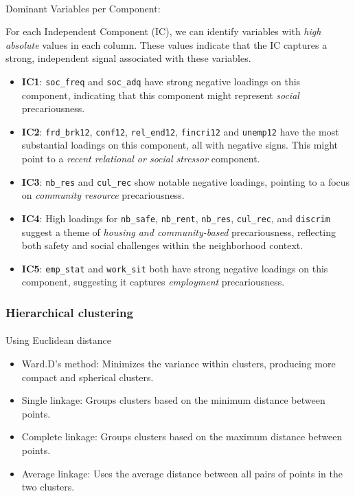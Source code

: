 \documentclass[
]{article}
\makeatletter
\let\oldparagraph\paragraph
\renewcommand{\paragraph}{
    \@ifstar
      \xxxParagraphStar
      \xxxParagraphNoStar
  }
\newcommand{\xxxParagraphStar}[1]{\oldparagraph*{#1}\mbox{}}
\newcommand{\xxxParagraphNoStar}[1]{\oldparagraph{#1}\mbox{}}
\providecommand{\tightlist}{%
  \setlength{\itemsep}{0pt}\setlength{\parskip}{0pt}}\usepackage{longtable,booktabs,array}
\makeatother
\begin{document}
\paragraph{Dominant Variables per
Component:}\label{dominant-variables-per-component}

For each Independent Component (IC), we can identify variables with
\emph{high absolute} values in each column. These values indicate that
the IC captures a strong, independent signal associated with these
variables.

\begin{itemize}
\item
  \textbf{IC1}: \texttt{soc\_freq} and \texttt{soc\_adq} have strong
  negative loadings on this component, indicating that this component
  might represent \emph{social} precariousness.
\item
  \textbf{IC2}: \texttt{frd\_brk12}, \texttt{conf12},
  \texttt{rel\_end12}, \texttt{fincri12} and \texttt{unemp12} have the
  most substantial loadings on this component, all with negative signs.
  This might point to a \emph{recent relational or social stressor}
  component.
\item
  \textbf{IC3}: \texttt{nb\_res} and \texttt{cul\_rec} show notable
  negative loadings, pointing to a focus on \emph{community resource}
  precariousness.
\item
  \textbf{IC4}: High loadings for \texttt{nb\_safe}, \texttt{nb\_rent},
  \texttt{nb\_res}, \texttt{cul\_rec}, and \texttt{discrim} suggest a
  theme of \emph{housing and community-based} precariousness, reflecting
  both safety and social challenges within the neighborhood context.
\item
  \textbf{IC5}: \texttt{emp\_stat} and \texttt{work\_sit} both have
  strong negative loadings on this component, suggesting it captures
  \emph{employment} precariousness.
\end{itemize}

\subsubsection{Hierarchical clustering}\label{hierarchical-clustering}

\paragraph{Using Euclidean distance}\label{using-euclidean-distance}

\begin{itemize}
\tightlist
\item
  Ward.D's method: Minimizes the variance within clusters, producing
  more compact and spherical clusters.
\item
  Single linkage: Groups clusters based on the minimum distance between
  points.
\item
  Complete linkage: Groups clusters based on the maximum distance
  between points.
\item
  Average linkage: Uses the average distance between all pairs of points
  in the two clusters.
\end{itemize}
\end{document}
